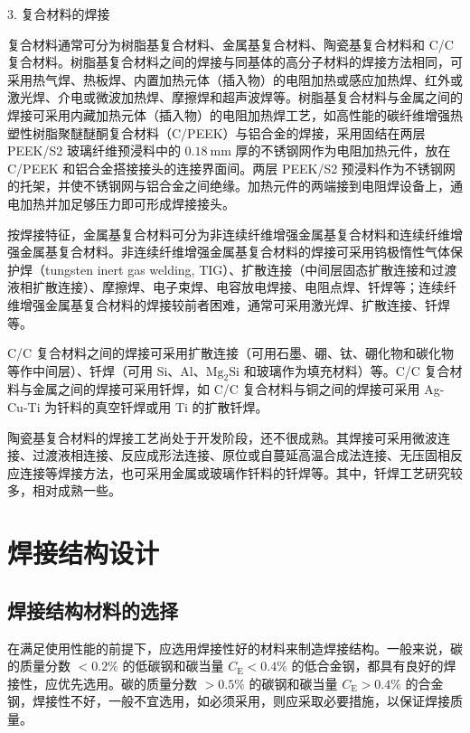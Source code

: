 \documentclass[UTF8]{ctexbook}
\newcommand{\◎}{\ensuremath{\bigcirc}}
\begin{document}
3. 复合材料的焊接

复合材料通常可分为树脂基复合材料、金属基复合材料、陶瓷基复合材料和 C/C 复合材料。树脂基复合材料之间的焊接与同基体的高分子材料的焊接方法相同，可采用热气焊、热板焊、内置加热元体（插入物）的电阻加热或感应加热焊、红外或激光焊、介电或微波加热焊、摩擦焊和超声波焊等。树脂基复合材料与金属之间的焊接可采用内藏加热元体（插入物）的电阻加热焊工艺，如高性能的碳纤维增强热塑性树脂聚醚醚酮复合材料（C/PEEK）与铝合金的焊接，采用固结在两层 PEEK/S2 玻璃纤维预浸料中的 $0.18 \mathrm{~mm}$ 厚的不锈钢网作为电阻加热元件，放在 C/PEEK 和铝合金搭接接头的连接界面间。两层 PEEK/S2 预浸料作为不锈钢网的托架，并使不锈钢网与铝合金之间绝缘。加热元件的两端接到电阻焊设备上，通电加热并加足够压力即可形成焊接接头。

按焊接特征，金属基复合材料可分为非连续纤维增强金属基复合材料和连续纤维增强金属基复合材料。非连续纤维增强金属基复合材料的焊接可采用钨极惰性气体保护焊（tungsten inert gas welding, TIG）、扩散连接（中间层固态扩散连接和过渡液相扩散连接）、摩擦焊、电子束焊、电容放电焊接、电阻点焊、钎焊等；连续纤维增强金属基复合材料的焊接较前者困难，通常可采用激光焊、扩散连接、钎焊等。

C/C 复合材料之间的焊接可采用扩散连接（可用石墨、硼、钛、硼化物和碳化物等作中间层）、钎焊（可用 Si、Al、$\mathrm{Mg}_{2}\mathrm{Si}$ 和玻璃作为填充材料）等。C/C 复合材料与金属之间的焊接可采用钎焊，如 C/C 复合材料与铜之间的焊接可采用 Ag-Cu-Ti 为钎料的真空钎焊或用 Ti 的扩散钎焊。

陶瓷基复合材料的焊接工艺尚处于开发阶段，还不很成熟。其焊接可采用微波连接、过渡液相连接、反应成形法连接、原位或自蔓延高温合成法连接、无压固相反应连接等焊接方法，也可采用金属或玻璃作钎料的钎焊等。其中，钎焊工艺研究较多，相对成熟一些。

\section{焊接结构设计}

\subsection{焊接结构材料的选择}

在满足使用性能的前提下，应选用焊接性好的材料来制造焊接结构。一般来说，碳的质量分数 $<0.2 \%$ 的低碳钢和碳当量 $C_{\mathrm{E}}<0.4 \%$ 的低合金钢，都具有良好的焊接性，应优先选用。碳的质量分数 $>0.5 \%$ 的碳钢和碳当量 $C_{\mathrm{E}}>0.4 \%$ 的合金钢，焊接性不好，一般不宜选用，如必须采用，则应采取必要措施，以保证焊接质量。
\end{document}
